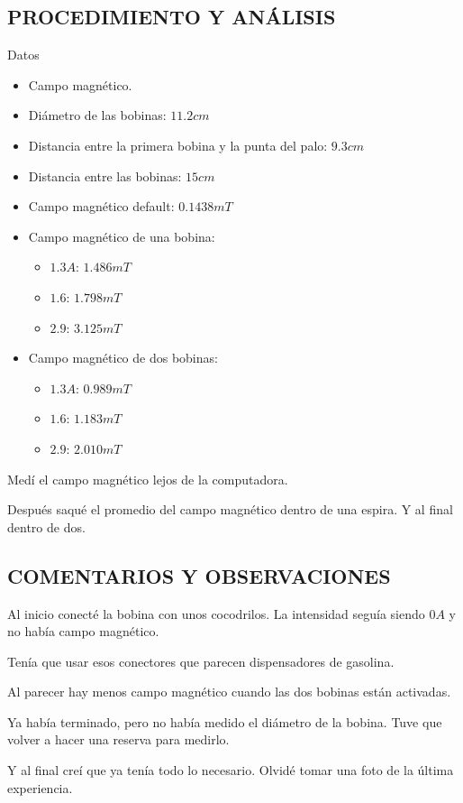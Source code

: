 \documentclass[10pt, twoside]{article}
\begin{document}
\subsection{PROCEDIMIENTO Y ANÁLISIS}%
Datos
\begin{itemize}
	\item Campo magnético.
	\item Diámetro de las bobinas: $11.2cm$
	\item Distancia entre la primera bobina y la punta del palo: $9.3cm$
	\item Distancia entre las bobinas: $15cm$
	\item Campo magnético default: $0.1438mT$
	\item Campo magnético de una bobina:
		\begin{itemize}
			\item $1.3A$: $1.486mT$
			\item $1.6$: $1.798mT$
			\item $2.9$: $3.125mT$
		\end{itemize}
	\item Campo magnético de dos bobinas:
		\begin{itemize}
			\item $1.3A$: $0.989mT$
			\item $1.6$: $1.183mT$
			\item $2.9$: $2.010mT$
		\end{itemize}
\end{itemize}

Medí el campo magnético lejos de la computadora.

Después saqué el promedio del campo magnético dentro de una espira.
Y al final dentro de dos.

\subsection{COMENTARIOS Y OBSERVACIONES}%

Al inicio conecté la bobina con unos cocodrilos.
La intensidad seguía siendo $0A$ y no había campo magnético.

Tenía que usar esos conectores que parecen dispensadores de gasolina.

Al parecer hay menos campo magnético cuando las dos bobinas
están activadas.

Ya había terminado, pero no había medido el diámetro de la bobina.
Tuve que volver a hacer una reserva para medirlo.

Y al final creí que ya tenía todo lo necesario.
Olvidé tomar una foto de la última experiencia.
\end{document}
